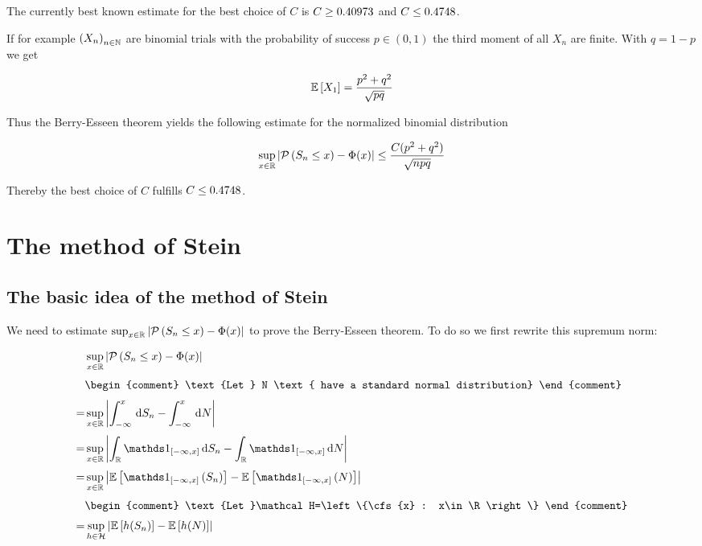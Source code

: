 \begin{remark}
  The currently best known estimate for the best choice of $C$ is $C \ge 0.40973$\cite{esseen1956} and $C \le 0.4748$\cite{shevtsova2011}.
\end{remark}

\begin{remark}
  If for example $\left({X_n}\right)_{{n}\in\mathbb N}$ are binomial trials with the probability of success $p \in (0,1)$ the third moment of all $X_n$ are finite. With $q=1-p$ we get 

\begin{align}
  \mathbb E\left[{X_1}\right]=\frac{p^2+q^2}{\sqrt{pq}}
\end{align}

Thus the Berry-Esseen theorem yields the following estimate for the normalized binomial distribution

\begin{align}
  \sup_{x\in\mathbb R} \left|{\mathcal P\left({S_n\le x}\right)-\Phi(x)}\right| \le \frac{C(p^2+q^2)}{\sqrt{npq}}
\end{align}

\noindent Thereby the best choice of $C$ fulfills $C \le 0.4748$.
\end{remark}

\section{The method of Stein}

\subsection{The basic idea of the method of Stein}

We need to estimate $\sup_{x\in\mathbb R} \left|{\mathcal P\left({S_n\le x}\right)-\Phi(x)}\right|$ to prove the Berry-Esseen theorem. To do so we first rewrite this supremum norm:

\begin{align}
   & \sup_{x\in\R} \abs{\P{S_n\le x}-\Phi(x)} \nl
   &
   \begin{comment}
     \text{Let } N \text{ have a standard normal distribution}
   \end{comment} \nl
  =& \sup_{x\in\R} \abs{\int_{-\infty}^x \d{S_n} - \int_{-\infty}^x \d{N}} \nl
  =& \sup_{x\in\R} \abs{\int_{\R} \cfs{x} \d{S_n} - \int_{\R} \cfs{x} \d{N}} \nl
  =& \sup_{x\in\R} \abs{\E{\cf{x}{S_n}} - \E{\cf{x}{N}}} \nl
   &
   \begin{comment}
     \text{Let }\mathcal H=\left\{\cfs{x} : x\in\R\right\}
   \end{comment} \nl
  =& \sup_{h\in\mathcal H} \abs{\E{h(S_n)}-\E{h(N)}}
\end{align}

